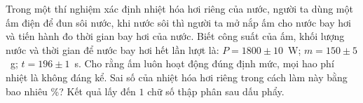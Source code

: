 	\begin{ex}%
		Trong một thí nghiệm xác định nhiệt hóa hơi riêng của nước, người ta dùng một ấm điện để đun sôi nước, khi nước sôi thì người ta mở nắp ấm cho nước bay hơi và tiến hành đo thời gian bay hơi của nước. Biết công suất của ấm, khối lượng nước và thời gian để nước bay hơi hết lần lượt là: $P=1800\pm 10$~W; $m=150\pm 5$~g; $t=196\pm 1$~s. Cho rằng ấm luôn hoạt động đúng định mức, mọi hao phí nhiệt là không đáng kể. Sai số của nhiệt hóa hơi riêng trong cách làm này bằng bao nhiêu \%? Kết quả lấy đến $1$ chữ số thập phân sau dấu phẩy.
		\par
	\end{ex}

